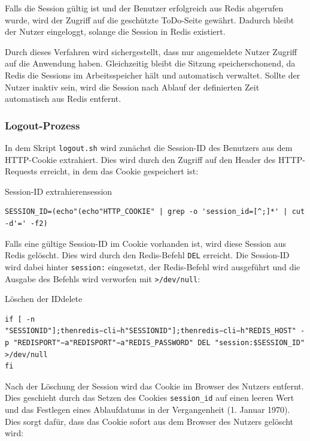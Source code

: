 Falls die Session gültig ist und der Benutzer erfolgreich aus Redis abgerufen wurde, wird der Zugriff auf die geschützte ToDo-Seite gewährt. Dadurch bleibt der Nutzer eingeloggt, solange die Session in Redis existiert.

Durch dieses Verfahren wird sichergestellt, dass nur angemeldete Nutzer Zugriff auf die Anwendung haben. Gleichzeitig bleibt die Sitzung speicherschonend, da Redis die Sessions im Arbeitsspeicher hält und automatisch verwaltet. Sollte der Nutzer inaktiv sein, wird die Session nach Ablauf der definierten Zeit automatisch aus Redis entfernt.


\subsubsection{Logout-Prozess}

In dem Skript \texttt{logout.sh} wird zunächst die Session-ID des Benutzers aus dem HTTP-Cookie extrahiert. Dies wird durch den Zugriff auf den Header des HTTP-Requests erreicht, in dem das Cookie gespeichert ist:

\begin{code}{Session-ID extrahieren}{session}
        \begin{verbatim}
SESSION_ID=(echo"(echo"HTTP_COOKIE" | grep -o 'session_id=[^;]*' | cut -d'=' -f2)
  \end{verbatim}
\end{code}

Falls eine gültige Session-ID im Cookie vorhanden ist, wird diese Session aus Redis gelöscht. Dies wird durch den Redis-Befehl \texttt{DEL} erreicht. Die Session-ID wird dabei hinter \texttt{session:} eingesetzt, der Redis-Befehl wird ausgeführt und die Ausgabe des Befehls wird verworfen mit \texttt{>/dev/null}:

\begin{code}{Löschen der ID}{delete}
        \begin{verbatim}
if [ -n "SESSIONID"];thenredis−cli−h"SESSIONID"];thenredis−cli−h"REDIS_HOST" -p "REDISPORT"−a"REDISPORT"−a"REDIS_PASSWORD" DEL "session:$SESSION_ID" >/dev/null
fi
  \end{verbatim}
\end{code}

Nach der Löschung der Session wird das Cookie im Browser des Nutzers entfernt. Dies geschieht durch das Setzen des Cookies \texttt{session\_id} auf einen leeren Wert und das Festlegen eines Ablaufdatums in der Vergangenheit (1. Januar 1970). Dies sorgt dafür, dass das Cookie sofort aus dem Browser des Nutzers gelöscht wird:

